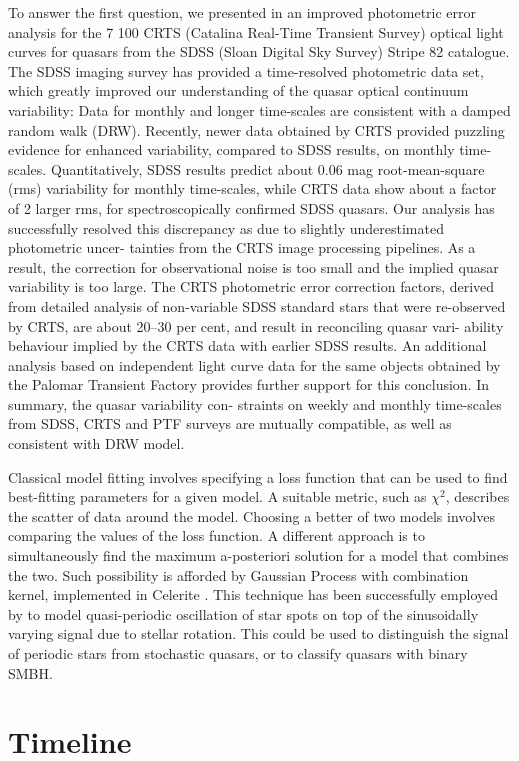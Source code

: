 \documentclass[modern]{aastex62}
\begin{document}
To answer the first question, we presented in \cite{suberlak2017} an improved photometric error analysis for the 7 100 CRTS (Catalina Real-Time Transient Survey) optical light curves for quasars from the SDSS (Sloan Digital Sky Survey) Stripe 82 catalogue. The SDSS imaging survey has provided a time-resolved photometric data set, which greatly improved our understanding of the quasar optical continuum variability: Data for monthly and longer time-scales are consistent with a damped random walk (DRW). Recently, newer data obtained by CRTS provided puzzling evidence for enhanced variability, compared to SDSS results, on monthly time-scales. Quantitatively, SDSS results predict about 0.06 mag root-mean-square (rms) variability for monthly time-scales, while CRTS data show about a factor of 2 larger rms, for spectroscopically confirmed SDSS quasars. Our analysis has successfully resolved this discrepancy as due to slightly underestimated photometric uncer- tainties from the CRTS image processing pipelines. As a result, the correction for observational noise is too small and the implied quasar variability is too large. The CRTS photometric error correction factors, derived from detailed analysis of non-variable SDSS standard stars that were re-observed by CRTS, are about 20–30 per cent, and result in reconciling quasar vari- ability behaviour implied by the CRTS data with earlier SDSS results. An additional analysis based on independent light curve data for the same objects obtained by the Palomar Transient Factory provides further support for this conclusion. In summary, the quasar variability con- straints on weekly and monthly time-scales from SDSS, CRTS and PTF surveys are mutually compatible, as well as consistent with DRW model.




Classical model fitting involves specifying a loss function that can be used to find best-fitting parameters for a given model. A suitable metric, such as $\chi^{2}$, describes the scatter of data around the model. Choosing a better of two models involves comparing the values of the loss function. A different approach is to simultaneously find the maximum a-posteriori solution for a model that combines the two. Such possibility is afforded by Gaussian Process with combination kernel,  implemented in Celerite  \citep{foreman2017}. This technique has been successfully employed by  \cite{angus2018}  to model  quasi-periodic oscillation of star spots on top of the sinusoidally varying signal due to stellar rotation. 
This could be used to distinguish the signal of periodic stars from  stochastic quasars, or to classify quasars with binary SMBH.






\section{Timeline}




\end{document}
